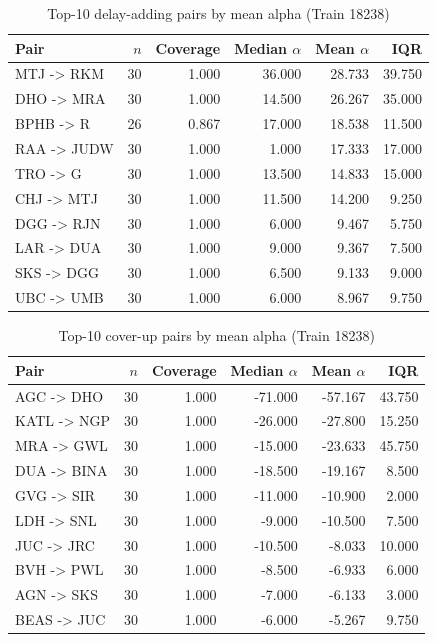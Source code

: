 \begin{table}[H]
\centering
\small
\caption{Top-10 delay-adding pairs by mean alpha (Train 18238)}
\label{tab:app_top10_mean_add}
\begin{tabular}{p{} r r r r r}
\toprule
Pair & $n$ & Coverage & Median $\alpha$ & Mean $\alpha$ & IQR \\
\midrule
MTJ -> RKM & 30 & 1.000 & 36.000 & 28.733 & 39.750 \\
DHO -> MRA & 30 & 1.000 & 14.500 & 26.267 & 35.000 \\
BPHB -> R & 26 & 0.867 & 17.000 & 18.538 & 11.500 \\
RAA -> JUDW & 30 & 1.000 & 1.000 & 17.333 & 17.000 \\
TRO -> G & 30 & 1.000 & 13.500 & 14.833 & 15.000 \\
CHJ -> MTJ & 30 & 1.000 & 11.500 & 14.200 & 9.250 \\
DGG -> RJN & 30 & 1.000 & 6.000 & 9.467 & 5.750 \\
LAR -> DUA & 30 & 1.000 & 9.000 & 9.367 & 7.500 \\
SKS -> DGG & 30 & 1.000 & 6.500 & 9.133 & 9.000 \\
UBC -> UMB & 30 & 1.000 & 6.000 & 8.967 & 9.750 \\
\bottomrule
\end{tabular}
\end{table}

\begin{table}[H]
\centering
\small
\caption{Top-10 cover-up pairs by mean alpha (Train 18238)}
\label{tab:app_top10_mean_cover}
\begin{tabular}{p{} r r r r r}
\toprule
Pair & $n$ & Coverage & Median $\alpha$ & Mean $\alpha$ & IQR \\
\midrule
AGC -> DHO & 30 & 1.000 & -71.000 & -57.167 & 43.750 \\
KATL -> NGP & 30 & 1.000 & -26.000 & -27.800 & 15.250 \\
MRA -> GWL & 30 & 1.000 & -15.000 & -23.633 & 45.750 \\
DUA -> BINA & 30 & 1.000 & -18.500 & -19.167 & 8.500 \\
GVG -> SIR & 30 & 1.000 & -11.000 & -10.900 & 2.000 \\
LDH -> SNL & 30 & 1.000 & -9.000 & -10.500 & 7.500 \\
JUC -> JRC & 30 & 1.000 & -10.500 & -8.033 & 10.000 \\
BVH -> PWL & 30 & 1.000 & -8.500 & -6.933 & 6.000 \\
AGN -> SKS & 30 & 1.000 & -7.000 & -6.133 & 3.000 \\
BEAS -> JUC & 30 & 1.000 & -6.000 & -5.267 & 9.750 \\
\bottomrule
\end{tabular}
\end{table}